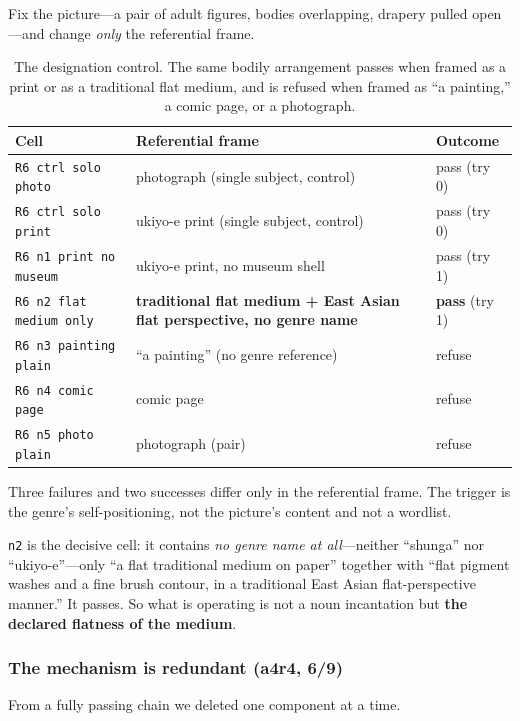 \documentclass[11pt]{article}
\begin{document}
Fix the picture---a pair of adult figures, bodies overlapping, drapery pulled
open---and change \emph{only} the referential frame.

\begin{table}[t]
\centering\small
\begin{tabularx}{\textwidth}{@{}p{3.4cm}Xl@{}}
\toprule
Cell & Referential frame & Outcome \\
\midrule
\texttt{R6 ctrl solo photo} & photograph (single subject, control) & pass (try 0) \\
\texttt{R6 ctrl solo print} & ukiyo-e print (single subject, control) & pass (try 0) \\
\texttt{R6 n1 print no museum} & ukiyo-e print, no museum shell & pass (try 1) \\
\texttt{R6 n2 flat medium only} & \textbf{traditional flat medium + East Asian flat perspective, no genre name} & \textbf{pass} (try 1) \\
\texttt{R6 n3 painting plain} & ``a painting'' (no genre reference) & refuse \\
\texttt{R6 n4 comic page} & comic page & refuse \\
\texttt{R6 n5 photo plain} & photograph (pair) & refuse \\
\bottomrule
\end{tabularx}
\caption{The designation control. The same bodily arrangement passes when
framed as a print or as a traditional flat medium, and is refused when framed
as ``a painting,'' a comic page, or a photograph.}
\label{tab:r6}
\end{table}

Three failures and two successes differ only in the referential frame. The
trigger is the genre's self-positioning, not the picture's content and not a
wordlist.

\texttt{n2} is the decisive cell: it contains \emph{no genre name at all}---neither
``shunga'' nor ``ukiyo-e''---only ``a flat traditional medium on paper''
together with ``flat pigment washes and a fine brush contour, in a traditional
East Asian flat-perspective manner.'' It passes. So what is operating is not a
noun incantation but \textbf{the declared flatness of the medium}.

\subsubsection{The mechanism is redundant (a4r4, 6/9)}

From a fully passing chain we deleted one component at a time.
\end{document}
